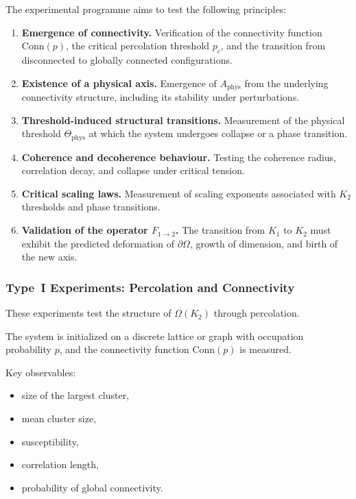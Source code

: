 The experimental programme aims to test the following principles:

\begin{enumerate}
    \item \textbf{Emergence of connectivity.}
          Verification of the connectivity function $\mathrm{Conn}(p)$,
          the critical percolation threshold $p_c$, and the transition
          from disconnected to globally connected configurations.

    \item \textbf{Existence of a physical axis.}
          Emergence of $A_{\mathrm{phys}}$ from the underlying
          connectivity structure, including its stability under perturbations.

    \item \textbf{Threshold-induced structural transitions.}
          Measurement of the physical threshold $\Theta_{\mathrm{phys}}$
          at which the system undergoes collapse or a phase transition.

    \item \textbf{Coherence and decoherence behaviour.}
          Testing the coherence radius, correlation decay, and collapse
          under critical tension.

    \item \textbf{Critical scaling laws.}
          Measurement of scaling exponents associated with $K_2$ thresholds
          and phase transitions.

    \item \textbf{Validation of the operator $F_{1 \rightarrow 2}$.}
          The transition from $K_1$ to $K_2$ must exhibit the predicted
          deformation of $\partial\Omega$, growth of dimension, and
          birth of the new axis.
\end{enumerate}



\subsubsection{Type~I Experiments: Percolation and Connectivity}

These experiments test the structure of $\Omega(K_2)$ through percolation.

The system is initialized on a discrete lattice or graph with occupation
probability $p$, and the connectivity function $\mathrm{Conn}(p)$ is measured.

Key observables:

\begin{itemize}
    \item size of the largest cluster,
    \item mean cluster size,
    \item susceptibility,
    \item correlation length,
    \item probability of global connectivity.
\end{itemize}

